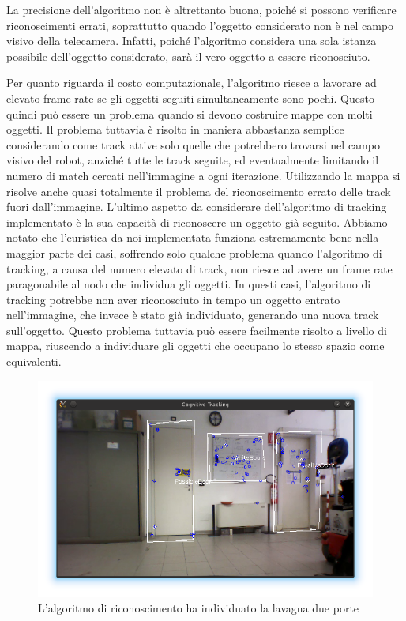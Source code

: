 La precisione dell'algoritmo non è altrettanto buona, poiché si possono verificare riconoscimenti errati, soprattutto quando l'oggetto considerato non è nel campo visivo della telecamera. Infatti, poiché l'algoritmo considera una sola istanza possibile dell'oggetto considerato, sarà il vero oggetto a essere riconosciuto.

Per quanto riguarda il costo computazionale, l'algoritmo riesce a lavorare ad elevato frame rate se gli oggetti seguiti simultaneamente sono pochi. Questo quindi può essere un problema quando si devono costruire mappe con molti oggetti. Il problema tuttavia è risolto in maniera abbastanza semplice considerando come track attive solo quelle che potrebbero trovarsi nel campo visivo del robot, anziché tutte le track seguite, ed eventualmente limitando il numero di match cercati nell'immagine a ogni iterazione. Utilizzando la mappa si risolve anche quasi totalmente il problema del riconoscimento errato delle track fuori dall'immagine.
L'ultimo aspetto da considerare dell'algoritmo di tracking implementato è la sua capacità di riconoscere un oggetto già seguito.
Abbiamo notato che l'euristica da noi implementata funziona estremamente bene nella maggior parte dei casi, soffrendo solo qualche problema quando l'algoritmo di tracking, a causa del numero elevato di track, non riesce ad avere un frame rate paragonabile al nodo che individua gli oggetti. In questi casi, l'algoritmo di tracking potrebbe non aver riconosciuto in tempo un oggetto entrato nell'immagine, che invece è stato già individuato, generando una nuova track sull'oggetto. Questo problema tuttavia può essere facilmente risolto a livello di mappa, riuscendo a individuare gli oggetti che occupano lo stesso spazio come equivalenti.

\begin{figure}[ht]
  \includegraphics[width=\textwidth]{immagini/risultati/tracker1}
  \caption[Immagine del tracker]{L'algoritmo di riconoscimento ha individuato la lavagna due porte}
  \label{fig:tracker1}
\end{figure}

